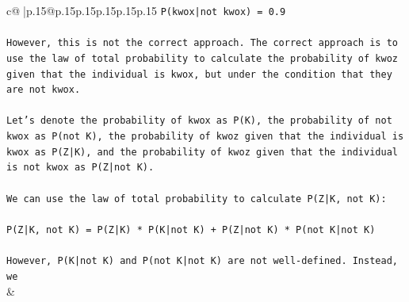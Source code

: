 \documentclass{article}
\begin{document}
{\begin{supertabular}{c@{$\;$}|p{.15\linewidth}@{}p{.15\linewidth}p{.15\linewidth}p{.15\linewidth}p{.15\linewidth}p{.15\linewidth}}
{{{\texttt{P(kwox|not kwox) = 0.9} \\
\\ 
\texttt{However, this is not the correct approach. The correct approach is to use the law of total probability to calculate the probability of kwoz given that the individual is kwox, but under the condition that they are not kwox.} \\
\\ 
\texttt{Let's denote the probability of kwox as P(K), the probability of not kwox as P(not K), the probability of kwoz given that the individual is kwox as P(Z|K), and the probability of kwoz given that the individual is not kwox as P(Z|not K).} \\
\\ 
\texttt{We can use the law of total probability to calculate P(Z|K, not K):} \\
\\ 
\texttt{P(Z|K, not K) = P(Z|K) * P(K|not K) + P(Z|not K) * P(not K|not K)} \\
\\ 
\texttt{However, P(K|not K) and P(not K|not K) are not well{-}defined. Instead, we} \\
            }
        }
    }
    & \\ \\

\end{supertabular}
}
\end{document}
